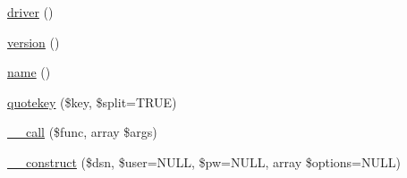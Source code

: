 \begin{DoxyCompactItemize}
\item 
\hyperlink{class_d_b_1_1_s_q_l_a050ad2e495e82f1399b484074dd4974d}{driver} ()
\item 
\hyperlink{class_d_b_1_1_s_q_l_a6080dae0886626b9a4cedb29240708b1}{version} ()
\item 
\hyperlink{class_d_b_1_1_s_q_l_a4b516aaa5fa38da4fed24ab6001627e2}{name} ()
\item 
\hyperlink{class_d_b_1_1_s_q_l_a7efb19068579d27341ed4361fca37eff}{quotekey} (\$key, \$split=T\+R\+UE)
\item 
\hyperlink{class_d_b_1_1_s_q_l_a975d2c46a134129eb727fadcadf48adf}{\+\_\+\+\_\+call} (\$func, array \$args)
\item 
\hyperlink{class_d_b_1_1_s_q_l_ae8468efbf3f6acec2855c63413e4251d}{\+\_\+\+\_\+construct} (\$dsn, \$user=N\+U\+LL, \$pw=N\+U\+LL, array \$options=N\+U\+LL)
\end{DoxyCompactItemize}
